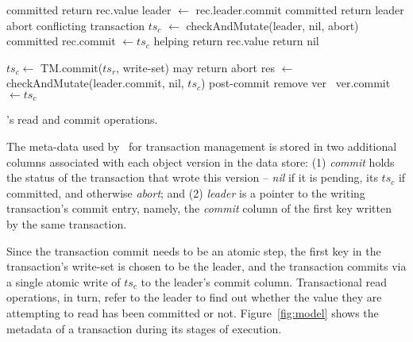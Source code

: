 \begin{algorithm}[t]
  \begin{algorithmic}
    \begin{small}
		 \Comment committed
     			   \State return rec.value \EndIf
      			\State leader $\leftarrow$ rec.leader.commit
      			  \Comment committed
     				   \State return leader \EndIf
			\Else \Comment abort conflicting transaction
				\State $ts_c$ $\leftarrow$ checkAndMutate(leader, nil, abort)
      				 \Comment  committed
     					 \State rec.commit $\leftarrow ts_c$ \Comment helping 
      				  	  return rec.value \EndIf
				\EndIf
			\EndIf
		\EndIf
      \EndFor
      \State  return nil
      \EndProcedure

\Statex

      
      	\State $ts_c \leftarrow$ TM.commit($ts_r$, write-set) \Comment may return abort
      	\State  res $\leftarrow$ {\sc checkAndMutate}(leader.commit, nil,  $ts_c$)
	\State \Comment post-commit
			 remove ver      	
			\Else\ ver.commit $\leftarrow ts_c$ 
			\EndIf
	\EndFor
\EndProcedure
      
       \end{small}
  \end{algorithmic}
  \caption{\sys's read and commit operations.} 
  \label{fig:get-pseudocode}
\end{algorithm} 

The meta-data used by \sys\ for transaction management is stored in two additional columns associated with each object version in the data store:
(1) \emph{commit} holds the status of the transaction that wrote this version -- \emph{nil} if it is pending, its  $ts_c$ if committed, and 
otherwise \emph{abort}; 
and
(2) \emph{leader} is a pointer to the writing transaction's commit entry, namely, the \emph{commit} column of the first key written by the same
transaction. 

Since the transaction commit needs to be an atomic step, the first key in the transaction's write-set is chosen to be the leader, and the transaction commits via a single atomic write of $ts_c$ to the leader's commit column. Transactional read operations, in turn, refer to the leader to find out whether the value they are attempting to read has been committed or not.
Figure~\ref{fig:model} shows the metadata of a transaction during its stages of execution. 

